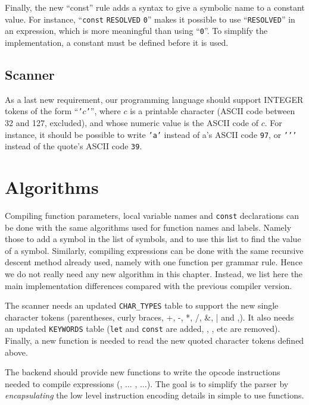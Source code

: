 Finally, the new ``const'' rule adds a syntax to give a symbolic name to a
constant value. For instance, ``{\tt const} {\tt RESOLVED} {\tt 0}'' makes it
possible to use ``{\tt RESOLVED}'' in an expression, which is more meaningful
than using ``{\tt 0}''. To simplify the implementation, a constant must be
defined before it is used.

\subsection{Scanner}

As a last new requirement, our programming language should support INTEGER
tokens of the form ``{\tt '$c$'}'', where $c$ is a printable character (ASCII
code between 32 and 127, excluded), and whose numeric value is the ASCII code
of $c$. For instance, it should be possible to write {\tt 'a'} instead of a's
ASCII code {\tt 97}, or {\tt '\hspace{0pt}'\hspace{0pt}'} instead of the
quote's ASCII code {\tt 39}.

\section{Algorithms}\label{subsection:toyc2-algorithms}

Compiling function parameters, local variable names and {\tt const}
declarations can be done with the same algorithms used for function names and
labels. Namely those to add a symbol in the list of symbols, and to use this
list to find the value of a symbol. Similarly, compiling expressions can be
done with the same recursive descent method already used, namely with one
function per grammar rule. Hence we do not really need any new algorithm in
this chapter. Instead, we list here the main implementation differences
compared with the previous compiler version.

The scanner needs an updated {\tt CHAR\_TYPES} table to support the new single
character tokens (parentheses, curly braces, +, -, *, /, \&, | and ,). It also
needs an updated {\tt KEYWORDS} table ({\tt let} and {\tt const} are added,
, , etc are removed). Finally, a new function is needed to
read the new quoted character tokens defined above.

The backend should provide new functions to write the opcode instructions
needed to compile expressions (, $\ldots$ , $\ldots$).
The goal is to simplify the parser by {\em encapsulating} the low level
instruction encoding details in simple to use functions.

